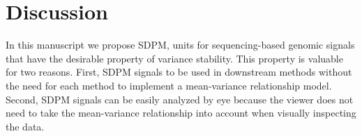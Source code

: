 \documentclass[11pt]{article}
\begin{document}









\section{Discussion}

In this manuscript we propose SDPM, units for sequencing-based genomic signals that have the desirable property of variance stability. 
This property is valuable for two reasons. 
First, SDPM signals to be used in downstream methods without the need for each method to implement a  mean-variance relationship model.
Second, SDPM signals can be easily analyzed by eye because the viewer does not need to take the mean-variance relationship into account when visually inspecting the data. 
\end{document}

